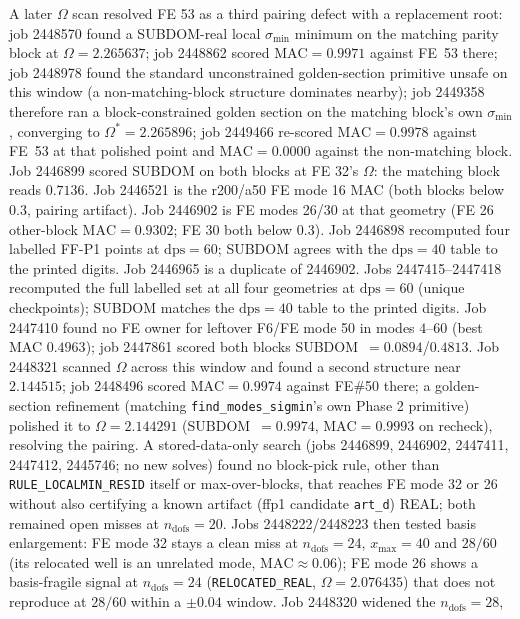 \documentclass[11pt]{article}
\begin{document}
\begin{itemize}
A later $\Omega$ scan resolved FE 53 as a third pairing defect with a
replacement root: job 2448570 found a SUBDOM-real local $\sigma_{\min}$
minimum on the matching parity block at $\Omega=2.265637$; job 2448862
scored $\mathrm{MAC}=0.9971$ against FE~53 there; job 2448978 found the
standard unconstrained golden-section primitive unsafe on this window
(a non-matching-block structure dominates nearby); job 2449358 therefore
ran a block-constrained golden section on the matching block's own
$\sigma_{\min}$, converging to $\Omega^{*}=2.265896$; job 2449466
re-scored $\mathrm{MAC}=0.9978$ against FE~53 at that polished point
and $\mathrm{MAC}=0.0000$ against the non-matching block.
Job 2446899 scored SUBDOM on both blocks at FE 32's $\Omega$: the
matching block reads $0.7136$. Job 2446521 is the r200/a50 FE mode 16
MAC (both blocks below $0.3$, pairing artifact). Job 2446902 is FE
modes 26/30 at that geometry (FE 26 other-block $\mathrm{MAC}=0.9302$;
FE 30 both below $0.3$). Job 2446898 recomputed four labelled FF-P1
points at $\mathrm{dps}=60$; SUBDOM agrees with the $\mathrm{dps}=40$
table to the printed digits. Job 2446965 is a duplicate of 2446902.
Jobs 2447415--2447418 recomputed the full labelled set at all four
geometries at $\mathrm{dps}=60$ (unique checkpoints); SUBDOM matches
the $\mathrm{dps}=40$ table to the printed digits. Job 2447410 found no
FE owner for leftover F6/FE mode 50 in modes $4$--$60$ (best MAC
$0.4963$); job 2447861 scored both blocks SUBDOM~$=0.0894$/$0.4813$.
Job 2448321 scanned $\Omega$ across this window and found a second
structure near $2.144515$; job 2448496 scored $\mathrm{MAC}=0.9974$
against FE\#50 there; a golden-section refinement (matching
\texttt{find\_modes\_sigmin}'s own Phase 2 primitive) polished it to
$\Omega=2.144291$ (SUBDOM~$=0.9974$, $\mathrm{MAC}=0.9993$ on recheck),
resolving the pairing.
A stored-data-only search (jobs 2446899, 2446902, 2447411, 2447412,
2445746; no new solves) found no block-pick rule, other than
\texttt{RULE\_LOCALMIN\_RESID} itself or max-over-blocks, that
reaches FE mode 32 or 26 without also certifying a known artifact
(ffp1 candidate \texttt{art\_d}) REAL; both remained open misses at
$n_{\mathrm{dofs}}=20$. Jobs 2448222/2448223 then tested basis
enlargement: FE mode 32 stays a clean miss at $n_{\mathrm{dofs}}=24$,
$x_{\max}=40$ and $28/60$ (its relocated well is an unrelated mode,
$\mathrm{MAC}\approx0.06$); FE mode 26 shows a basis-fragile signal
at $n_{\mathrm{dofs}}=24$ (\texttt{RELOCATED\_REAL},
$\Omega=2.076435$) that does not reproduce at $28/60$ within a
$\pm0.04$ window. Job 2448320 widened the $n_{\mathrm{dofs}}=28$,

\end{itemize}
\end{document}
